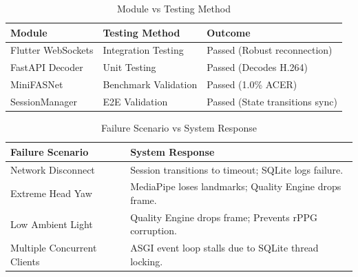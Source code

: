 \begin{table}[H]
\centering
\caption{Module vs Testing Method}
\begin{tabularx}{\textwidth}{|X|X|X|}
\hline
\textbf{Module} & \textbf{Testing Method} & \textbf{Outcome} \\
\hline
Flutter WebSockets & Integration Testing & Passed (Robust reconnection) \\
FastAPI Decoder & Unit Testing & Passed (Decodes H.264) \\
MiniFASNet & Benchmark Validation & Passed (1.0\% ACER) \\
SessionManager & E2E Validation & Passed (State transitions sync) \\
\hline
\end{tabularx}
\end{table}

\begin{table}[H]
\centering
\caption{Failure Scenario vs System Response}
\begin{tabularx}{\textwidth}{|X|X|}
\hline
\textbf{Failure Scenario} & \textbf{System Response} \\
\hline
Network Disconnect & Session transitions to timeout; SQLite logs failure. \\
Extreme Head Yaw & MediaPipe loses landmarks; Quality Engine drops frame. \\
Low Ambient Light & Quality Engine drops frame; Prevents rPPG corruption. \\
Multiple Concurrent Clients & ASGI event loop stalls due to SQLite thread locking. \\
\hline
\end{tabularx}
\end{table}